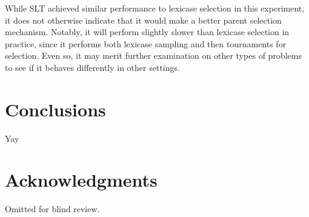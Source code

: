 \documentclass{sig-alternate-05-2015}
\begin{document}
While SLT achieved similar performance to lexicase selection in this experiment, it does not otherwise indicate that it would make a better parent selection mechanism. Notably, it will perform slightly slower than lexicase selection in practice, since it performs both lexicase sampling and then tournaments for selection. Even so, it may merit further examination on other types of problems to see if it behaves differently in other settings.


\section{Conclusions}

Yay


\section{Acknowledgments}
Omitted for blind review.

%

%
%
\end{document}
